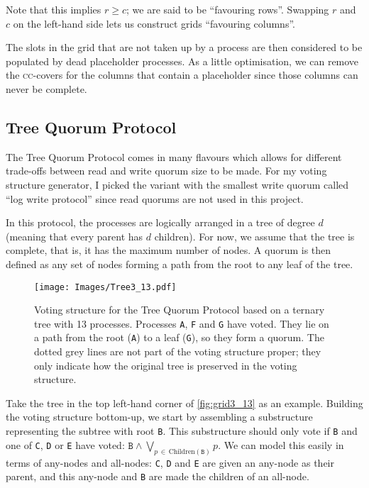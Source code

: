 \documentclass[11pt,chapterprefix=true,toc=bibliography,numbers=noendperiod,
               footnotes=multiple,twoside]{scrreprt}
\begin{document}
Note that this implies \(r \geq c\); we are said to be \enquote{favouring rows}. Swapping \(r\) and \(c\) on the left-hand side lets us construct grids \enquote{favouring columns}.

The slots in the grid that are not taken up by a process are then considered to be populated by dead placeholder processes. As a little optimisation, we can remove the \textsc{cc}-covers for the columns that contain a placeholder since those columns can never be complete.

\subsection{Tree Quorum Protocol}

The Tree Quorum Protocol \autocite{tree} comes in many flavours which allows for different trade-offs between read and write quorum size to be made. For my voting structure generator, I picked the variant with the smallest write quorum called \enquote{log write protocol} since read quorums are not used in this project.

In this protocol, the processes are logically arranged in a tree of degree \(d\) (meaning that every parent has \(d\) children). For now, we assume that the tree is complete, that is, it has the maximum number of nodes. A quorum is then defined as any set of nodes forming a path from the root to any leaf of the tree.

\begin{figure}[h]
    \centering
    \texttt{[image: Images/Tree3\_13.pdf]}
    \caption{Voting structure for the Tree Quorum Protocol based on a ternary tree with 13 processes. Processes \texttt{A}, \texttt{F} and \texttt{G} have voted. They lie on a path from the root (\texttt{A}) to a leaf (\texttt{G}), so they form a quorum. The dotted grey lines are not part of the voting structure proper; they only indicate how the original tree is preserved in the voting structure.}
    \label{fig:grid3_13}
\end{figure}

Take the tree in the top left-hand corner of \autoref{fig:grid3_13} as an example. Building the voting structure bottom-up, we start by assembling a substructure representing the subtree with root \texttt{B}. This substructure should only vote if \texttt{B} and one of \texttt{C}, \texttt{D} or \texttt{E} have voted: \( \texttt{B} \wedge \bigvee_{p\,\in\,\text{Children}(\texttt{B})} p \). We can model this easily in terms of any-nodes and all-nodes: \texttt{C}, \texttt{D} and \texttt{E} are given an any-node as their parent, and this any-node and \texttt{B} are made the children of an all-node.
\end{document}
